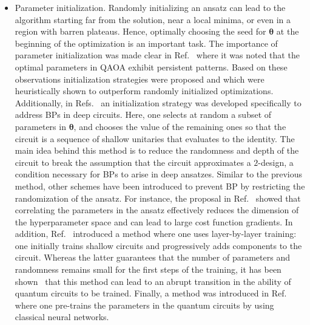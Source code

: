 \documentclass[prx,twocolumn,floatfix,superscriptaddress,longbibliography]{revtex4-1}
\renewcommand{\vec}[1]{\boldsymbol{#1}}  %
\newcommand{\<}{\langle}
\renewcommand{\>}{\rangle}
\renewcommand{\vec}[1]{\boldsymbol{#1}}  %
\begin{document}
\begin{itemize}
\item{Parameter initialization.} Randomly initializing an ansatz can lead to the algorithm starting far from the solution, near a local minima, or even in a region with barren plateaus. Hence, optimally choosing the seed for $\vec{\theta}$ at the beginning of the optimization is an important task. The importance of parameter initialization was made clear in Ref.~\cite{qaoaPerformanceLukin2018} where it was noted that the optimal parameters in QAOA exhibit persistent patterns. Based on these observations initialization strategies were proposed and which were heuristically shown to outperform randomly initialized optimizations. Additionally, in Refs.~\cite{grant2019initialization,wiersema2020exploring} an initialization strategy was developed specifically to address BPs in deep circuits. Here, one selects at random a subset of parameters in $\vec{\theta}$, and chooses the value of the remaining ones so that the circuit is a sequence of shallow unitaries that evaluates to the identity. The main idea behind this method is to reduce the randomness and depth of the circuit to break the assumption that the circuit approximates a $2$-design, a condition necessary for BPs to arise in deep ansatzes. Similar to the previous method, other schemes have been introduced to prevent BP by restricting the randomization of the ansatz. For instance, the proposal in Ref.~\cite{volkoff2020large} showed that correlating the parameters in the ansatz effectively reduces the dimension of the hyperparameter space and  can lead to large cost function gradients. In addition, Ref.~\cite{skolik2020layerwise} introduced a method where one uses layer-by-layer training: one initially trains shallow circuits and progressively adds components to the circuit. Whereas the latter guarantees that the number of parameters and randomness remains small for the first steps of the training, it has been shown~\cite{campos2020abrupt} that this method can lead to an abrupt transition in the ability of quantum circuits to be trained. Finally, a method was introduced in Ref.~\cite{verdon2019learning} where one pre-trains the parameters in the quantum circuits by using classical neural networks. 
    

\end{itemize}
\end{document}
